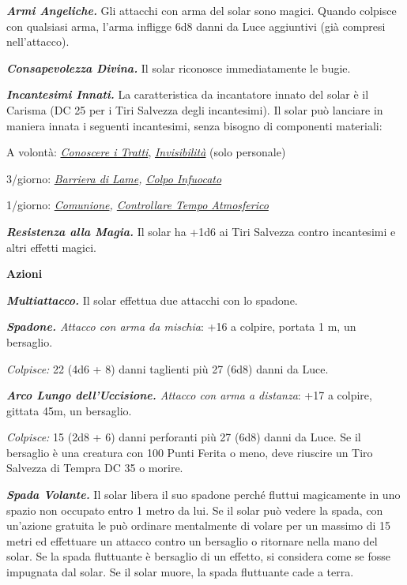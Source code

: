 \begin{multicols}{2}
{\emph{\textbf{Armi Angeliche.}} Gli attacchi con arma del solar sono magici. Quando colpisce con qualsiasi arma, l'arma infligge 6d8 danni da Luce aggiuntivi (già compresi nell'attacco).

\emph{\textbf{Consapevolezza Divina.}} Il solar riconosce immediatamente le bugie.

\emph{\textbf{Incantesimi Innati.}} La caratteristica da incantatore innato del solar è il Carisma (DC 25 per i Tiri Salvezza degli incantesimi). Il solar può lanciare in maniera innata i seguenti incantesimi, senza bisogno di componenti materiali:

A volontà: \emph{\hyperlink{Conoscere i Tratti}{Conoscere i Tratti}}, \emph{\hyperlink{Invisibilità}{Invisibilità}} (solo personale)

3/giorno: \emph{\hyperlink{Barriera di Lame}{Barriera di Lame}, \hyperlink{Colpo Infuocato}{Colpo Infuocato}}

1/giorno: \emph{\hyperlink{Comunione}{Comunione}, \hyperlink{Controllare Tempo Atmosferico}{Controllare Tempo Atmosferico}}

\emph{\textbf{Resistenza alla Magia.}} Il solar ha +1d6 ai Tiri Salvezza contro incantesimi e altri effetti magici.

\textbf{Azioni}

\emph{\textbf{Multiattacco.}} Il solar effettua due attacchi con lo spadone.

\emph{\textbf{Spadone.} Attacco con arma da mischia}: +16 a colpire, portata 1 m, un bersaglio.

\emph{Colpisce:} 22 (4d6 + 8) danni taglienti più 27 (6d8) danni da Luce.

\emph{\textbf{Arco Lungo dell'Uccisione.} Attacco con arma a distanza}: +17 a colpire, gittata 45m, un bersaglio.

\emph{Colpisce:} 15 (2d8 + 6) danni perforanti più 27 (6d8) danni da Luce. Se il bersaglio è una creatura con 100 Punti Ferita o meno, deve riuscire un Tiro Salvezza di Tempra DC 35 o morire.

\emph{\textbf{Spada Volante.}} Il solar libera il suo spadone perché fluttui magicamente in uno spazio non occupato entro 1 metro da lui. Se il solar può vedere la spada, con un'azione gratuita le può ordinare mentalmente di volare per un massimo di 15 metri ed effettuare un attacco contro un bersaglio o ritornare nella mano del solar. Se la spada fluttuante è bersaglio di un effetto, si considera come se fosse impugnata dal solar. Se il solar muore, la spada fluttuante cade a terra.

}
\end{multicols}
